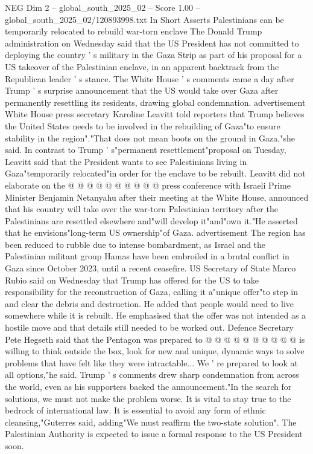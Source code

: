 \begin{textsample}{NEG Dim 2 – global\_south\_2025\_02 – Score 1.00 – global\_south\_2025\_02/120893998.txt}  \label{ex:f2_neg_027}
In Short Asserts Palestinians can be temporarily relocated to rebuild war-torn enclave The Donald Trump administration on Wednesday said that the US President has not committed to deploying the country ' s military in the Gaza Strip as part of his proposal for a US takeover of the Palestinian enclave, in an apparent backtrack from the Republican leader ' s stance.
The White House ' s comments came a day after Trump ' s surprise announcement that the US would take over Gaza after permanently resettling its residents, drawing global condemnation. advertisement White House press secretary Karoline Leavitt told reporters that Trump believes the United States needs to be involved in the rebuilding of Gaza"to ensure stability in the region"."That does not mean boots on the ground in Gaza,"she said.
In contrast to Trump ' s"permanent resettlement"proposal on Tuesday, Leavitt said that the President wants to see Palestinians living in Gaza"temporarily relocated"in order for the enclave to be rebuilt.
Leavitt did not elaborate on the @ @ @ @ @ @ @ @ @ @ press conference with Israeli Prime Minister Benjamin Netanyahu after their meeting at the White House, announced that his country will take over the war-torn Palestinian territory after the Palestinians are resettled elsewhere and"will develop it"and"own it."He asserted that he envisions"long-term US ownership"of Gaza. advertisement The region has been reduced to rubble due to intense bombardment, as Israel and the Palestinian militant group Hamas have been embroiled in a brutal conflict in Gaza since October 2023, until a recent ceasefire.
US Secretary of State Marco Rubio said on Wednesday that Trump has offered for the US to take responsibility for the reconstruction of Gaza, calling it a"unique offer"to step in and clear the debris and destruction.
He added that people would need to live somewhere while it is rebuilt.
He emphasised that the offer was not intended as a hostile move and that details still needed to be worked out.
Defence Secretary Pete Hegseth said that the Pentagon was prepared to @ @ @ @ @ @ @ @ @ @ is willing to think outside the box, look for new and unique, dynamic ways to solve problems that have felt like they were intractable...
We ' re prepared to look at all options,"he said.
Trump ' s comments drew sharp condemnation from across the world, even as his supporters backed the announcement."In the search for solutions, we must not make the problem worse.
It is vital to stay true to the bedrock of international law.
It is essential to avoid any form of ethnic cleansing,"Guterres said, adding"We must reaffirm the two-state solution".
The Palestinian Authority is expected to issue a formal response to the US President soon.

\end{textsample}
